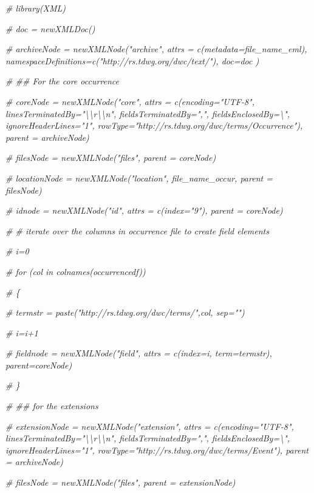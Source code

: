 \documentclass[
]{book}
\newenvironment{Shaded}{\begin{snugshade}}{\end{snugshade}}
\newcommand{\CommentTok}[1]{\textcolor[rgb]{0.56,0.35,0.01}{\textit{#1}}}
\begin{document}
\begin{Shaded}
\begin{Highlighting}[]
\CommentTok{\# library(XML)}


\CommentTok{\# doc = newXMLDoc()}

\CommentTok{\# archiveNode = newXMLNode("archive", attrs = c(metadata=file\_name\_eml), namespaceDefinitions=c("http://rs.tdwg.org/dwc/text/"), doc=doc )}


\CommentTok{\# \#\# For the core occurrence}

\CommentTok{\# coreNode = newXMLNode("core", attrs = c(encoding="UTF{-}8", linesTerminatedBy="\textbackslash{}\textbackslash{}r\textbackslash{}\textbackslash{}n", fieldsTerminatedBy=",", fieldsEnclosedBy=\textquotesingle{}\textbackslash{}"\textquotesingle{}, ignoreHeaderLines="1", rowType="http://rs.tdwg.org/dwc/terms/Occurrence"), parent = archiveNode)}

\CommentTok{\# filesNode = newXMLNode("files", parent = coreNode)}

\CommentTok{\# locationNode = newXMLNode("location", file\_name\_occur, parent = filesNode)}

\CommentTok{\# idnode = newXMLNode("id", attrs = c(index="9"), parent = coreNode)}


\CommentTok{\# \# iterate over the columns in occurrence file to create field elements}

\CommentTok{\# i=0}

\CommentTok{\# for (col in colnames(occurrencedf))}

\CommentTok{\#     \{}

\CommentTok{\#     termstr = paste("http://rs.tdwg.org/dwc/terms/",col, sep="")}

\CommentTok{\#     i=i+1}

\CommentTok{\#     fieldnode = newXMLNode("field", attrs = c(index=i, term=termstr), parent=coreNode)}

\CommentTok{\# \}}



\CommentTok{\# \#\# for the extensions}

\CommentTok{\# extensionNode = newXMLNode("extension", attrs = c(encoding="UTF{-}8", linesTerminatedBy="\textbackslash{}\textbackslash{}r\textbackslash{}\textbackslash{}n", fieldsTerminatedBy=",", fieldsEnclosedBy=\textquotesingle{}\textbackslash{}"\textquotesingle{}, ignoreHeaderLines="1", rowType="http://rs.tdwg.org/dwc/terms/Event"), parent = archiveNode)}

\CommentTok{\# filesNode = newXMLNode("files", parent = extensionNode)}


\end{Highlighting}
\end{Shaded}
\end{document}
